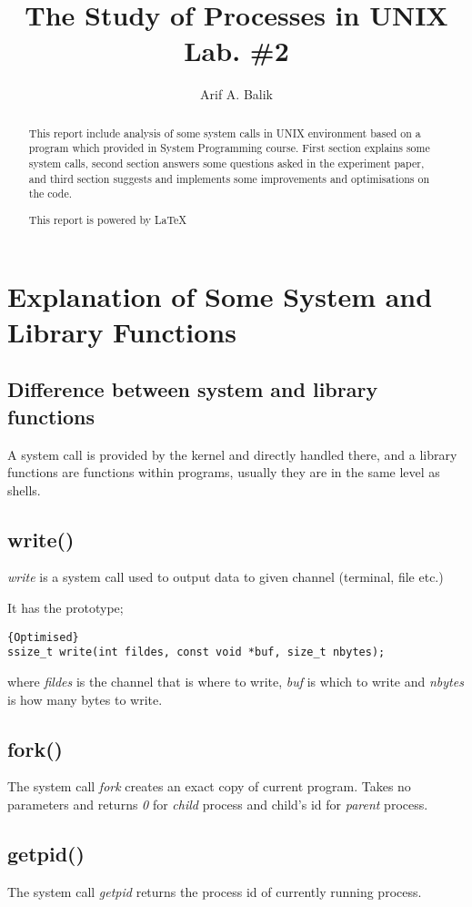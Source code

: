 \documentclass[11pt]{article}
\title{The Study of Processes in UNIX \\Lab. \#2}
\author{Arif A. Balik}
\affil{Undergraduate Student\\
	Sytstems Programming\\
	Department of Computer Science\\
	Arel University\\
	Büyükçekmece, İstanbul 34537\\
    Email: arifbalik@outlook.com
}
\begin{document}
\maketitle

\begin{abstract}
This report include analysis of some system calls in UNIX environment based on a program which provided in System Programming course. First section explains some system calls, second section answers some questions asked in the experiment paper, and third section suggests and implements some improvements and optimisations on the code.

This report is powered by \LaTeX{}
\end{abstract}
\section*{Explanation of Some System and Library Functions}
\subsection*{Difference between system and library functions}
A system call is provided by the kernel and directly handled there, and a library functions are functions within programs, usually they are in the same level as shells.

\subsection*{write()}
\textit{write} is a system call used to output data to given channel (terminal, file etc.)

It has the prototype;

\begin{lstlisting}[frame=tlrb]{Optimised}
ssize_t write(int fildes, const void *buf, size_t nbytes);
\end{lstlisting}

where \textit{fildes} is the channel that is where to write, \textit{buf} is which to write and \textit{nbytes} is how many bytes to write.

\subsection*{fork()}
The system call \textit{fork} creates an exact copy of current program. Takes no parameters and returns \textit{0} for \textit{child} process and child's id for \textit{parent} process.

\subsection*{getpid()}
The system call \textit{getpid} returns the process id of currently running process.
\end{document}
